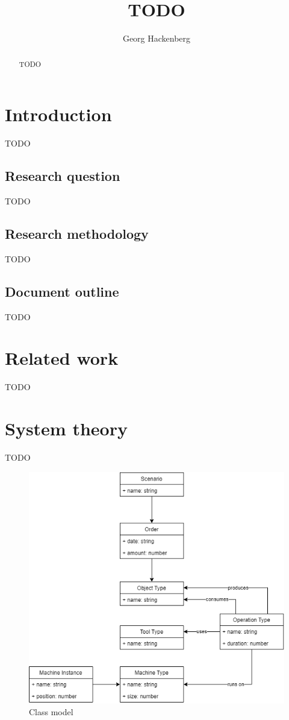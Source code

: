 \documentclass{article}
\begin{document}
    \title{TODO}
    \author{Georg Hackenberg}
    \maketitle

    \begin{abstract}
        TODO
    \end{abstract}
    
    \section{Introduction}
    \label{sec:intro}
    TODO~\cite{key}

    \subsection*{Research question}
    TODO

    \subsection*{Research methodology}
    TODO

    \subsection*{Document outline}
    TODO

    \section{Related work}
    \label{sec:related}
    TODO

    \section{System theory}
    \label{sec:theory}
    TODO

    \begin{figure}
        \centering
        \includegraphics[width=\textwidth]{../../models/class-model.png}
        \caption{Class model}
        \label{fig:model}
    \end{figure}
\end{document}
